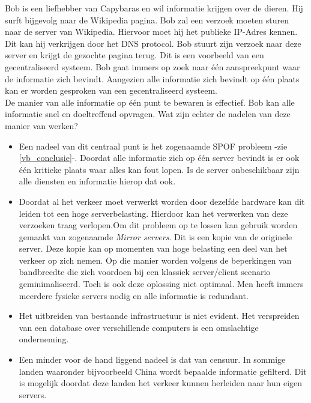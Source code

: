 Bob is een liefhebber van Capybaras en wil informatie krijgen over de dieren. Hij surft bijgevolg naar de Wikipedia pagina. Bob zal een verzoek moeten sturen naar de server van Wikipedia. Hiervoor moet hij het publieke IP-Adres kennen. Dit kan hij verkrijgen door het DNS protocol. Bob stuurt zijn verzoek naar deze server en krijgt de gezochte pagina terug. Dit is een voorbeeld van een gecentraliseerd systeem. Bob gaat immers op zoek naar één aanspreekpunt waar de informatie zich bevindt. Aangezien alle informatie zich bevindt op één plaats kan er worden gesproken van een gecentraliseerd systeem.\\

De manier van alle informatie op één punt te bewaren is effectief. Bob kan alle informatie snel en doeltreffend opvragen. Wat zijn echter de nadelen van deze manier van werken?

\begin{itemize}
	\item Een nadeel van dit centraal punt is het zogenaamde SPOF probleem -zie \ref{vb_conclusie}-. Doordat alle informatie zich op één server bevindt is er ook één kritieke plaats waar alles kan fout lopen. Is de server onbeschikbaar zijn alle diensten en informatie hierop dat ook.\\
	
	\item Doordat al het verkeer moet verwerkt worden door dezelfde hardware kan dit leiden tot een hoge serverbelasting. Hierdoor kan het verwerken van deze verzoeken traag verlopen.Om dit probleem op te lossen kan gebruik worden gemaakt van zogenaamde \textit{Mirror servers}. Dit is een kopie van de originele server. Deze kopie kan op momenten van hoge belasting een deel van het verkeer op zich nemen. Op die manier worden volgens \textcite{Webb2007} de beperkingen van bandbreedte die zich voordoen bij een klassiek server/client scenario geminimaliseerd. Toch is ook deze oplossing niet optimaal. Men heeft immers meerdere fysieke servers nodig en alle informatie is redundant. \\
	
	\item Het uitbreiden van bestaande infrastructuur is niet evident. Het verspreiden van een database over verschillende computers is een omslachtige onderneming.\\
		
	\item Een minder voor de hand liggend nadeel is dat van censuur. In sommige landen waaronder bijvoorbeeld China wordt bepaalde informatie gefilterd. Dit is mogelijk doordat deze landen het verkeer kunnen herleiden naar hun eigen servers.
\end{itemize}

